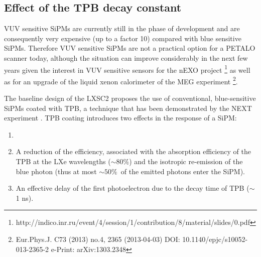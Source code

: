\documentclass[review]{elsarticle}
\begin{document}
{\subsection*{Effect of the TPB decay constant}
VUV sensitive SiPMs are currently still in the phase of development and are consequently very expensive (up to a factor 10) compared with blue sensitive SiPMs. 
 Therefore VUV sensitive SiPMs are not a practical option
for a PETALO scanner today, although the situation can improve considerably in the next few years given the interest in VUV sensitive sensors for the nEXO project \footnote{http://indico.inr.ru/event/4/session/1/contribution/8/material/slides/0.pdf} as well as for an upgrade of the 
liquid xenon calorimeter of the MEG experiment \footnote{Eur.Phys.J. C73 (2013) no.4, 2365
(2013-04-03)
DOI: 10.1140/epjc/s10052-013-2365-2
e-Print: arXiv:1303.2348}. 

The baseline design of the LXSC2 proposes the use of conventional, blue-sensitive SiPMs coated with TPB, a technique that has been demonstrated by the NEXT experiment \cite{Alvarez:2012ub}. TPB coating introduces two effects in the response of a SiPM:

\begin{enumerate}
\item \item A reduction of the efficiency, associated with the absorption efficiency of the TPB at the LXe wavelengths ($\sim 80\%$) and the isotropic 
re-emission of the blue photon (thus at most $\sim 50\%$~of the emitted photons enter the SiPM). 
 \item An effective delay of the first photoelectron due to the decay time of TPB ($\sim $ 1 ns). 
\end{enumerate}

}
\end{document}
